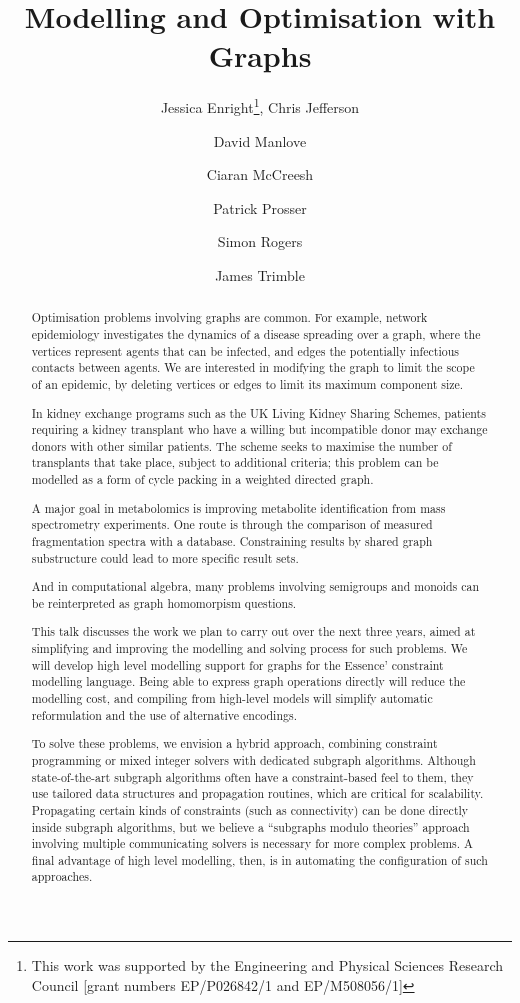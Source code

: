 \documentclass{llncs}
\title{Modelling and Optimisation with Graphs}
\author{
    Jessica Enright\inst{1}\thanks{This work was supported by the Engineering and Physical Sciences
    Research Council [grant numbers EP/P026842/1 and EP/M508056/1]},
    Chris Jefferson\inst{2}\samethanks[1] \and
    David Manlove\inst{3} \and
    Ciaran McCreesh\inst{3}\samethanks[1] \and
    Patrick Prosser\inst{3}\samethanks[1] \and
    Simon Rogers \inst{3} \and
    James Trimble\inst{3}\samethanks[1]
}
\institute{
    University of Stirling, Stirling, Scotland \and
    University of St Andrews, St Andrews, United Kingdom \and
    University of Glasgow, Glasgow, Scotland}
\begin{document}
\maketitle

\begin{abstract}
    Optimisation problems involving graphs are common. For example, network epidemiology
    investigates the dynamics of a disease spreading over a graph, where the vertices represent
    agents that can be infected, and edges the potentially infectious contacts between agents.  We
    are interested in modifying the graph to limit the scope of an epidemic, by deleting vertices or
    edges to limit its maximum component size.

    In kidney exchange programs such as the UK Living Kidney Sharing Schemes, patients requiring a
    kidney transplant who have a willing but incompatible donor may exchange donors with other
    similar patients. The scheme seeks to maximise the number of transplants that take place,
    subject to additional criteria; this problem can be modelled as a form of cycle packing in a
    weighted directed graph.

    A major goal in metabolomics is improving metabolite identification from mass spectrometry
    experiments. One route is through the comparison of measured fragmentation spectra with a
    database. Constraining results by shared graph substructure could lead to more specific result
    sets.

    And in computational algebra, many problems involving semigroups and monoids can be
    reinterpreted as graph homomorpism questions.

    This talk discusses the work we plan to carry out over the next three years, aimed at
    simplifying and improving the modelling and solving process for such problems.  We will develop
    high level modelling support for graphs for the Essence' constraint modelling language.  Being
    able to express graph operations directly will reduce the modelling cost, and compiling from
    high-level models will simplify automatic reformulation and the use of alternative encodings.

    To solve these problems, we envision a hybrid approach, combining constraint programming or
    mixed integer solvers with dedicated subgraph algorithms. Although state-of-the-art subgraph
    algorithms often have a constraint-based feel to them, they use tailored data structures and
    propagation routines, which are critical for scalability. Propagating certain kinds of
    constraints (such as connectivity) can be done directly inside subgraph algorithms, but we
    believe a ``subgraphs modulo theories'' approach involving multiple communicating solvers is
    necessary for more complex problems. A final advantage of high level modelling, then, is in
    automating the configuration of such approaches.
\end{abstract}
\end{document}

